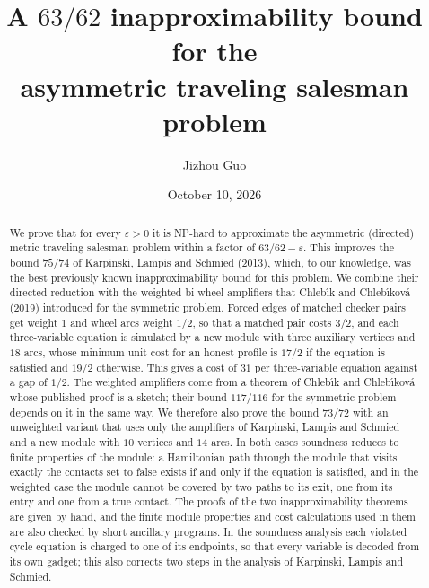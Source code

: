 \documentclass[11pt]{amsart}
\theoremstyle{definition}
\theoremstyle{remark}
\numberwithin{equation}{section}
\newcommand{\eps}{\varepsilon}
\begin{document}
\title[A 63/62 inapproximability bound for asymmetric TSP]{A $63/62$ inapproximability bound for the\\ asymmetric traveling salesman problem}

\author{Jizhou Guo}

\date{October 10, 2026}


\begin{abstract}
We prove that for every $\eps>0$ it is NP-hard to approximate the asymmetric (directed) metric traveling salesman problem within a factor of $63/62-\eps$. This improves the bound $75/74$ of Karpinski, Lampis and Schmied (2013), which, to our knowledge, was the best previously known inapproximability bound for this problem. We combine their directed reduction with the weighted bi-wheel amplifiers that Chleb\'{\i}k and Chleb\'{\i}kov\'a (2019) introduced for the symmetric problem. Forced edges of matched checker pairs get weight $1$ and wheel arcs weight $1/2$, so that a matched pair costs $3/2$, and each three-variable equation is simulated by a new module with three auxiliary vertices and $18$ arcs, whose minimum unit cost for an honest profile is $17/2$ if the equation is satisfied and $19/2$ otherwise. This gives a cost of $31$ per three-variable equation against a gap of $1/2$. The weighted amplifiers come from a theorem of Chleb\'{\i}k and Chleb\'{\i}kov\'a whose published proof is a sketch; their bound $117/116$ for the symmetric problem depends on it in the same way. We therefore also prove the bound $73/72$ with an unweighted variant that uses only the amplifiers of Karpinski, Lampis and Schmied and a new module with $10$ vertices and $14$ arcs. In both cases soundness reduces to finite properties of the module: a Hamiltonian path through the module that visits exactly the contacts set to false exists if and only if the equation is satisfied, and in the weighted case the module cannot be covered by two paths to its exit, one from its entry and one from a true contact. The proofs of the two inapproximability theorems are given by hand, and the finite module properties and cost calculations used in them are also checked by short ancillary programs. In the soundness analysis each violated cycle equation is charged to one of its endpoints, so that every variable is decoded from its own gadget; this also corrects two steps in the analysis of Karpinski, Lampis and Schmied.
\end{abstract}
\end{document}
